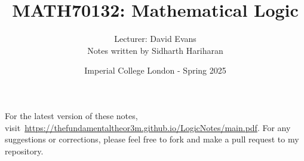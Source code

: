 \documentclass[a4paper, 12pt, openany, oneside]{book}
\title{\vspace{-2em}MATH70132: Mathematical Logic}
\author{Lecturer: David Evans \\ Notes written by Sidharth Hariharan}
\date{Imperial College London - Spring 2025}
\begin{document}
\setlength{\abovedisplayskip}{7.5pt}  %
\setlength{\belowdisplayskip}{7.5pt}  %
\setlength{\abovedisplayshortskip}{2pt}
\setlength{\belowdisplayshortskip}{2pt}

\maketitle
\thispagestyle{empty}

\tableofcontents
\thispagestyle{empty}

\newpage






% 



\newpage

\thispagestyle{empty}

\printbibliography[title={References}, prenote=mybibnote]

For the latest version of these notes, visit~\url{https://thefundamentaltheor3m.github.io/LogicNotes/main.pdf}. For any suggestions or corrections, please feel free to fork and make a pull request to my repository.
\end{document}
